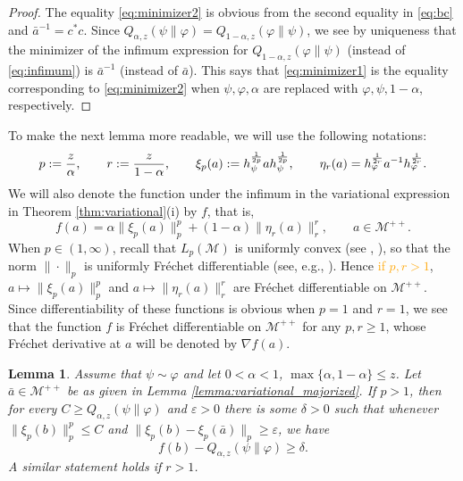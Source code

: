 \documentclass[12pt]{article}
\newtheorem{lemma}[theorem]{Lemma}
\theoremstyle{definition}
\theoremstyle{remark}
\numberwithin{equation}{section}
\def\Me{\mathcal M}
\def\ffi{\varphi}
\def\eps{\varepsilon}
\begin{document}
\begin{proof}
The equality  \eqref{eq:minimizer2} is obvious from the second equality in \eqref{eq:bc} and
$\bar a^{-1}=c^*c$. Since $Q_{\alpha,z}(\psi\|\ffi)=Q_{1-\alpha,z}(\ffi\|\psi)$, we see by uniqueness that
the minimizer of the infimum expression for $Q_{1-\alpha,z}(\ffi\|\psi)$ (instead of \eqref{eq:infimum}) is
$\bar a^{-1}$ (instead of $\bar a$). This says that \eqref{eq:minimizer1} is the equality corresponding to
\eqref{eq:minimizer2} when $\psi,\ffi,\alpha$ are replaced with $\ffi,\psi,1-\alpha$, respectively. 
\end{proof}

To make the next lemma more readable, we will use the following notations:
\[
p:={z\over\alpha},\qquad r:={z\over 1-\alpha},\qquad
\xi_p(a):=h_\psi^{1\over2p}ah_\psi^{1\over 2p},\qquad
\eta_r(a)=h_\ffi^{1\over2r}a^{-1}h_\ffi^{1\over 2r}.
\]
We will also denote the function under the infimum in the variational expression in
Theorem \ref{thm:variational}(i) by $f$, that is,
\begin{equation}\label{func-variational}
f(a)=\alpha\|\xi_p(a)\|_p^p
+(1-\alpha)\|\eta_r(a)\|_r^r,\qquad a\in \Me^{++}.
\end{equation}
{When $p\in(1,\infty)$, recall that $L_p(\Me)$ is uniformly convex (see
\cite{haagerup1979lpspaces}, \cite[Theorem 4.2]{kosaki1984applications}), so that the norm
$\|\cdot\|_p$ is uniformly Fr\'echet differentiable (see, e.g.,
\cite[Part 3, Chap.~II]{beauzamy1982introduction}). Hence \textcolor{orange}{if $p,r>1$}, $a\mapsto\|\xi_p(a)\|_p^p$
and $a\mapsto\|\eta_r(a)\|_r^r$ are Fr\'echet differentiable on $\Me^{++}$. Since differentiability of
these functions is obvious when $p=1$ and $r=1$, we see that the function $f$ is Fr\'echet differentiable
on $\Me^{++}$ for any $p,r\ge1$, whose Fr\'echet derivative at $a$ will be denoted by $\nabla f(a)$.}

\begin{lemma}\label{lemma:variational_majorized2}
Assume that $\psi\sim\ffi$  and let $0<\alpha<1$, $\max\{\alpha,1-\alpha\}\le z$. {Let
$\bar a\in\Me^{++}$ be as given in Lemma \ref{lemma:variational_majorized}.} If $p>1$, then for
every $C\ge Q_{\alpha,z}(\psi\|\ffi)$ and $\eps>0$ there is some $\delta>0$ such that whenever
$\|\xi_p(b)\|^p_p\le C$ and $\|\xi_p(b)-\xi_p(\bar a)\|_p\ge \eps$, we have
\[
f(b)-Q_{\alpha,z}(\psi\|\ffi)\ge \delta.
\]
A similar statement holds if $r>1$.
\end{lemma}
\end{document}
